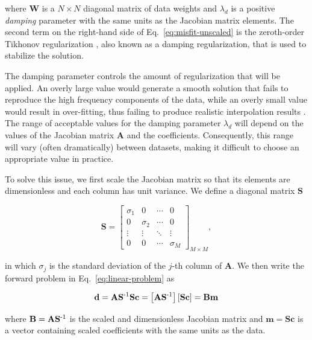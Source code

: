 \noindent where
$\mathbf{W}$ is a $N \times N$ diagonal matrix of data weights and
$\lambda_d$ is a positive \emph{damping} parameter with the same units as the
Jacobian matrix elements.
The second term on the right-hand side of Eq.~\ref{eq:misfit-unscaled} is the
zeroth-order Tikhonov regularization \citep{tikhonov1977}, also known as a
damping regularization, that is used to stabilize the solution.

The damping parameter controls the amount of regularization that will be
applied.
An overly large value would generate a smooth solution that fails to reproduce
the high frequency components of the data, while an overly small value would
result in over-fitting, thus failing to produce realistic interpolation results
\citep{martinez2016}.
The range of acceptable values for the damping parameter $\lambda_d$ will
depend on the values of the Jacobian matrix $\mathbf{A}$ and the coefficients.
Consequently, this range will vary (often dramatically) between datasets,
making it difficult to choose an appropriate value in practice.

To solve this issue, we first scale the Jacobian matrix so that its elements
are dimensionless and each column has unit variance.
We define a diagonal matrix $\mathbf{S}$

\begin{equation}
    \mathbf{S} =
    \begin{bmatrix}
      \sigma_1 & 0 & \cdots &0 \\
      0 & \sigma_2 & \cdots &0 \\
      \vdots & \vdots & \ddots & \vdots \\
      0  & 0 & \cdots & \sigma_M
    \end{bmatrix}_{M \times M}
    ,
\end{equation}

\noindent in which $\sigma_j$ is the standard deviation of the $j$-th column of
$\mathbf{A}$.
We then write the forward problem in Eq.~\ref{eq:linear-problem} as

\begin{equation}
    \mathbf{d}
    =
    \mathbf{A} \mathbf{S}^{\text{-}1} \mathbf{S} \mathbf{c}
    =
    \left[
        \mathbf{A} \mathbf{S}^{\text{-}1}
    \right]
    \left[
        \mathbf{S} \mathbf{c}
    \right]
    =
    \mathbf{B} \mathbf{m}
\end{equation}

\noindent where $\mathbf{B} = \mathbf{A} \mathbf{S}^{\text{-}1}$ is the scaled and
dimensionless Jacobian matrix
and $\mathbf{m} = \mathbf{S} \mathbf{c}$ is a vector containing scaled
coefficients with the same units as the data.

